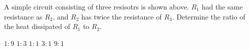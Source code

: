 \documentclass{../../../oss-classkick-exam}
\begin{document}
\begin{multicols*}{2}
\begin{questions}
    \question A simple circuit consisting of three resisotrs is shown above.
    $R_1$ had the same resistance as $R_2$, and $R_2$ has twice the resistance
    of $R_3$. Determine the ratio of the heat dissipated of $R_1$ to $R_2$.
    \begin{choices}
      \choice $1:9$
      \choice $1:3$
      \choice $1:1$
      \choice $3:1$
      \correctchoice $9:1$
    \end{choices}
  \end{questions}
\end{multicols*}
\newpage


\genfreedirections
\end{document}
